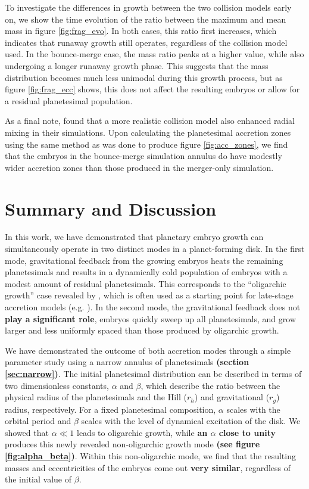 \documentclass[twocolumn,linenumbers]{aastex63}
\begin{document}
To investigate the differences in growth between the two collision models early on, we show the time evolution of the ratio 
between the maximum and mean mass in figure \ref{fig:frag_evo}. In both cases, this ratio first increases, which indicates that 
runaway growth still operates, regardless of the collision model used. In the bounce-merge case, the mass ratio peaks at a 
higher value, while also undergoing a longer runaway growth phase. This suggests that the mass distribution becomes much 
less unimodal during this growth process, but as figure \ref{fig:frag_ecc} shows, this does not affect the resulting embryos or 
allow for a residual planetesimal population.

As a final note, \citet{childs22} found that a more realistic collision model also enhanced radial mixing in their simulations. Upon 
calculating the planetesimal accretion zones using the same method as was done to produce figure \ref{fig:acc_zones}, we find 
that the embryos in the bounce-merge simulation annulus do have modestly wider accretion zones than those produced in the 
merger-only simulation.

\section{Summary and Discussion} \label{sec:discuss}

In this work, we have demonstrated that planetary embryo growth
can simultaneously operate in two distinct modes in a planet-forming disk. In the first
mode, gravitational feedback from the growing embryos heats the
remaining planetesimals and results in a dynamically cold population
of embryos with a modest amount of residual planetesimals. This
corresponds to the ``oligarchic growth'' case revealed by \citep{kokubo98}, which is often used as a starting point for late-stage 
accretion models (e.g. \citet{kokubo02, raymond05, raymond06}). In the second mode, the gravitational feedback does not 
\textbf{play a significant role}, embryos quickly sweep up all planetesimals, and grow larger and less uniformly spaced than those produced by 
oligarchic growth.

We have demonstrated the outcome of both accretion modes through a
simple parameter study using a narrow annulus of planetesimals \textbf{(section \ref{sec:narrow})}. The initial planetesimal distribution can be described in terms of two dimensionless 
constants, $\alpha$ and $\beta$, which describe the ratio between the physical radius of the planetesimals and the Hill ($r_{h}$) 
and gravitational ($r_{g}$) radius, respectively. For a fixed planetesimal composition, $\alpha$ scales with the orbital period and 
$\beta$ scales with the level of dynamical excitation of the disk. We showed that $\alpha \ll 1$ leads to oligarchic growth, while \textbf{an $\alpha$ close to unity} produces this newly revealed non-oligarchic growth mode \textbf{(see figure \ref{fig:alpha_beta})}. Within this non-oligarchic mode, we find that 
the resulting masses and eccentricities of the embryos come out \textbf{very similar}, regardless of the initial value of $\beta$.
\end{document}
